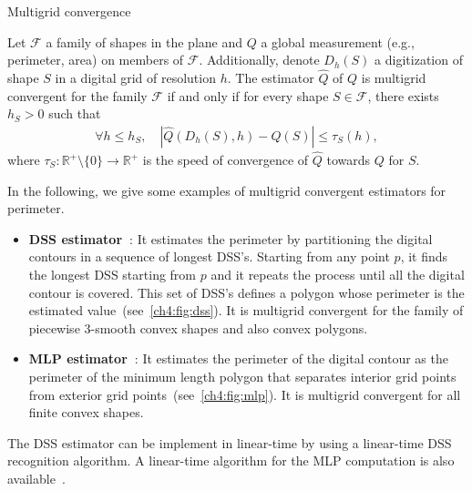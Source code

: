 \begin{definition}{Multigrid convergence}

Let $\mathcal{F}$ a family of shapes in the plane and $Q$ a global measurement (e.g., perimeter, area) on members of $\mathcal{F}$. Additionally, denote $D_h(S)$ a digitization of shape $S$ in a digital grid of resolution $h$. The estimator $\hat{Q}$ of $Q$ is multigrid convergent for the family $\mathcal{F}$ if and only if for every shape $S \in \mathcal{F}$, there exists $h_S > 0$ such that
\begin{align*}
\forall h \leq h_S, \quad |\hat{Q}(D_h(S),h) - Q(S)| \leq \tau_S(h),
\end{align*}
%
where $\tau_S:\mathbb{R}^+\setminus \{0\} \rightarrow \mathbb{R}^+$ is the speed of convergence of $\hat{Q}$ towards $Q$ for $S$.

\end{definition}

In the following, we give some examples of multigrid convergent estimators for perimeter.

\begin{itemize}
	\item[]{\textbf{DSS estimator~\cite{kovalevsky92theoretical}}: It estimates the perimeter by partitioning the digital contours in a sequence of longest DSS's. Starting from any point $p$, it finds the longest DSS starting from $p$ and it repeats the process until all the digital contour is covered. This set of DSS's defines a polygon whose perimeter is the estimated value~(see~\cref{ch4:fig:dss}). It is multigrid convergent for the family of piecewise $3$-smooth convex shapes and also convex polygons.}
	\item[]{\textbf{MLP estimator~\cite{sloboda98approximation}}: It estimates the perimeter of the digital contour as the perimeter of the minimum length polygon that separates interior grid points from exterior grid points~(see~\cref{ch4:fig:mlp}). It is multigrid convergent for all finite convex shapes.}
\end{itemize}

The DSS estimator can be implement in linear-time by using a linear-time DSS recognition algorithm. A linear-time algorithm for the MLP computation is also available~\cite{provenccal09two}.

